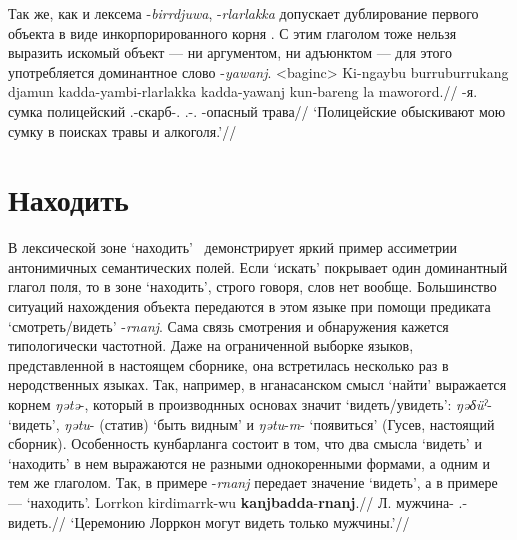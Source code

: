 Так же, как и лексема -\textit{birrdjuwa}, -\textit{rlarlakka} допускает дублирование первого объекта в виде инкорпорированного корня . С этим глаголом тоже нельзя выразить искомый объект --- ни аргументом, ни адъюнктом --- для этого употребляется доминантное слово -\textit{yawanj}.
\ex<baginc>\begingl
\gla Ki-ngaybu burruburrukang djamun kadda-yambi-rlarlakka kadda-yawanj kun-bareng la maworord.//
\glb \ki-я.\Gen{} сумка полицейский \Tpl.\Real-скарб-\rlk.\Np{} \Tpl.\Real-\yaw.\Np{} \Cliv-опасный \la{} трава//
\glft `Полицейские обыскивают мою сумку в поисках травы и алкоголя.'//%
\endgl\xe


\section{Находить}
\label{sec:find}
В лексической зоне `находить' \ демонстрирует яркий пример ассиметрии антонимичных семантических полей. Если `искать' покрывает один доминантный глагол поля, то в зоне `находить', строго говоря, слов нет вообще. Большинство ситуаций нахождения объекта передаются в этом языке при помощи предиката `смотреть/видеть' -\textit{rnanj}. Сама связь смотрения и обнаружения кажется типологически частотной. Даже на ограниченной выборке языков, представленной в настоящем сборнике, она встретилась несколько раз в неродственных языках. Так, например, в нганасанском смысл `найти' выражается корнем \textit{ŋətə}-, который в производнных основах значит `видеть/увидеть': \textit{ŋəδüˀ}- `видеть', \textit{ŋətu}- (статив) `быть видным' и \textit{ŋətu}-\textit{m}- `появиться' (Гусев, настоящий сборник). Особенность кунбарланга состоит в том, что два смысла `видеть' и `находить' в нем выражаются не разными однокоренными формами, а одним и тем же глаголом. Так, в примере  -\textit{rnanj} передает значение `видеть', а в примере  --- `находить'.
\begingl
\gla Lorrkon kirdimarrk-wu \textbf{kanjbadda}-\textbf{rnanj}.//
\glb Л. мужчина-\Lim{} \Tpl.\Fut-видеть.\Np{}//
\glft `Церемонию Лорркон могут видеть только мужчины.'//%
\endgl\xe

